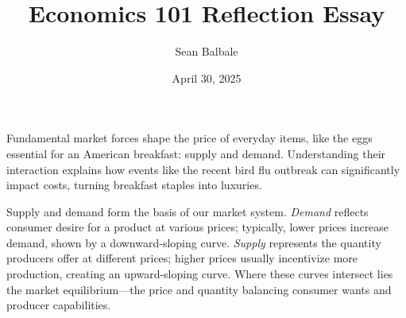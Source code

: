 \documentclass[12pt]{article}
\begin{document}
\makeatletter
\def\@maketitle{%
  \begin{center}%
  \let \footnote \thanks
    {\LARGE \@title \par}%
    {\large
      \@author \quad \@date}%
    \vskip 1em%
  \end{center}%
  \par
  \vskip 1.5em %
  }
\makeatother

\begin{doublespace}

    \title{Economics 101 Reflection Essay}
    \author{Sean Balbale}
    \date{April 30, 2025}

\maketitle

Fundamental market forces shape the price of everyday items, like the eggs essential for an American breakfast: supply and demand. Understanding their interaction explains how events like the recent bird flu outbreak can significantly impact costs, turning breakfast staples into luxuries.

Supply and demand form the basis of our market system. \emph{Demand} reflects consumer desire for a product at various prices; typically, lower prices increase demand, shown by a downward-sloping curve. \emph{Supply} represents the quantity producers offer at different prices; higher prices usually incentivize more production, creating an upward-sloping curve. Where these curves intersect lies the market equilibrium—the price and quantity balancing consumer wants and producer capabilities.


\end{doublespace}
\end{document}
